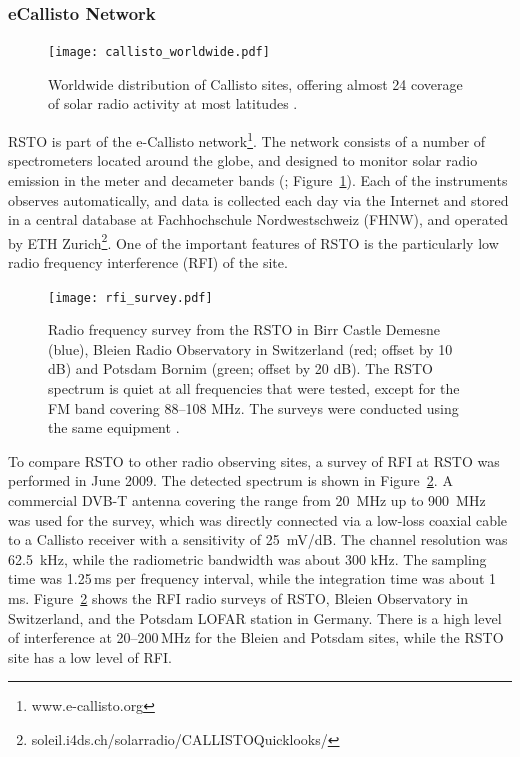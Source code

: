 \subsubsection{eCallisto Network}
\begin{figure}[!t]
\begin{center}
\texttt{[image: callisto\_worldwide.pdf]}
\caption[Callisto Worldwide]{Worldwide distribution of Callisto sites, offering almost 24 coverage of solar radio activity at most latitudes \citep{zucca2012}.}
\label{fig:callisto_worldwide}
\end{center}
\end{figure}
RSTO is part of the e-Callisto network\footnote{www.e-callisto.org}. The network consists of a number of spectrometers located around the globe, and designed to monitor solar radio emission in the meter and decameter bands (\citealt{Benz2009}; Figure~\ref{fig:callisto_worldwide}).  Each of the instruments observes automatically, and data is collected each day via the Internet and stored in a central database at Fachhochschule Nordwestschweiz (FHNW), and operated by ETH Zurich\footnote{soleil.i4ds.ch/solarradio/CALLISTOQuicklooks/}. One of the important features of RSTO is the particularly low radio frequency interference (RFI) of the site. 
\begin{figure}[!t]
\begin{center}
\texttt{[image: rfi\_survey.pdf]}
\caption[RSTO RFI Survey]{Radio frequency survey from the RSTO in Birr Castle Demesne (blue), Bleien Radio Observatory in Switzerland (red; offset by 10 dB) and Potsdam Bornim (green; offset by 20 dB). The RSTO spectrum is quiet at all frequencies that were tested, except for the FM band covering 88--108 MHz. The surveys were conducted using the same equipment \citep{zucca2012}.}
\label{fig:rfisurvey}
\end{center}
\end{figure}

To compare RSTO to other radio observing sites, a survey of RFI at RSTO was performed in June 2009. The detected spectrum is shown in Figure~\ref{fig:rfisurvey}.  A commercial DVB-T antenna covering the range from 20~MHz up to 900~MHz was used for the survey, which was directly connected via a low-loss coaxial cable to a Callisto receiver with a sensitivity of 25~mV/dB. The channel resolution was 62.5~kHz, while the radiometric bandwidth was about 300 kHz. The sampling time was 1.25\,ms per frequency interval, while the integration time was about 1\,ms.  Figure~\ref{fig:rfisurvey} shows the RFI radio surveys of RSTO, Bleien Observatory in Switzerland, and the Potsdam LOFAR station in Germany. There is a high level of interference at 20--200\,MHz for the Bleien and Potsdam sites, while the RSTO site has a low level of RFI.

